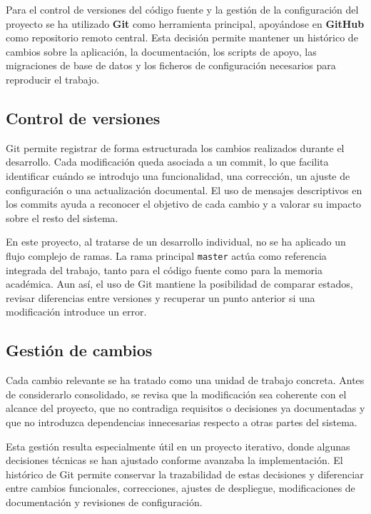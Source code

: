 Para el control de versiones del código fuente y la gestión de la configuración del proyecto se ha utilizado \textbf{Git} como herramienta principal, apoyándose en \textbf{GitHub} como repositorio remoto central. Esta decisión permite mantener un histórico de cambios sobre la aplicación, la documentación, los scripts de apoyo, las migraciones de base de datos y los ficheros de configuración necesarios para reproducir el trabajo.

\subsection{Control de versiones}

Git permite registrar de forma estructurada los cambios realizados durante el desarrollo. Cada modificación queda asociada a un commit, lo que facilita identificar cuándo se introdujo una funcionalidad, una corrección, un ajuste de configuración o una actualización documental. El uso de mensajes descriptivos en los commits ayuda a reconocer el objetivo de cada cambio y a valorar su impacto sobre el resto del sistema.

En este proyecto, al tratarse de un desarrollo individual, no se ha aplicado un flujo complejo de ramas. La rama principal \texttt{master} actúa como referencia integrada del trabajo, tanto para el código fuente como para la memoria académica. Aun así, el uso de Git mantiene la posibilidad de comparar estados, revisar diferencias entre versiones y recuperar un punto anterior si una modificación introduce un error.

\subsection{Gestión de cambios}

Cada cambio relevante se ha tratado como una unidad de trabajo concreta. Antes de considerarlo consolidado, se revisa que la modificación sea coherente con el alcance del proyecto, que no contradiga requisitos o decisiones ya documentadas y que no introduzca dependencias innecesarias respecto a otras partes del sistema.

Esta gestión resulta especialmente útil en un proyecto iterativo, donde algunas decisiones técnicas se han ajustado conforme avanzaba la implementación. El histórico de Git permite conservar la trazabilidad de estas decisiones y diferenciar entre cambios funcionales, correcciones, ajustes de despliegue, modificaciones de documentación y revisiones de configuración.

